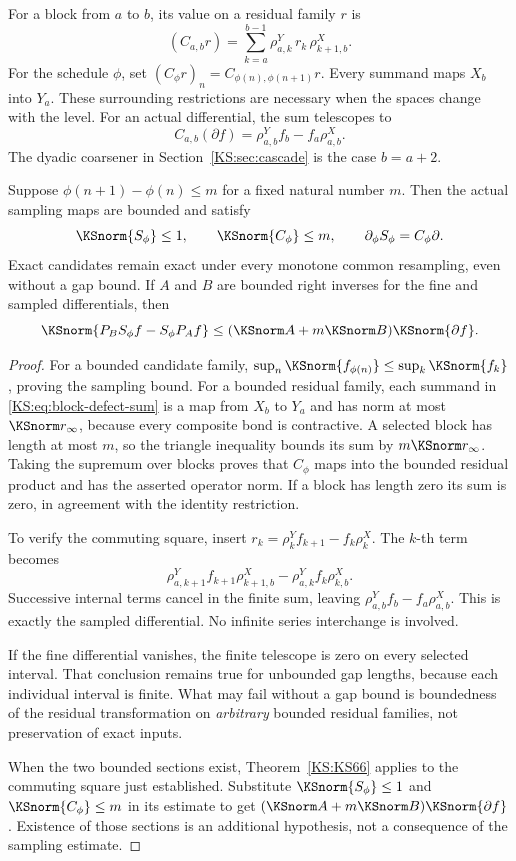 For a block from \(a\) to \(b\), its value on a residual family \(r\) is
\begin{equation}\label{KS:eq:block-defect-sum}
 (C_{a,b}r)=\sum_{k=a}^{b-1}
 \rho^Y_{a,k}\,r_k\,\rho^X_{k+1,b}.
\end{equation}
For the schedule \(\phi\), set \((C_\phi r)_n=C_{\phi(n),\phi(n+1)}r\). Every summand maps \(X_b\) into \(Y_a\). These surrounding restrictions are necessary when the spaces change with the level. For an actual differential, the sum telescopes to
\[
 C_{a,b}(\partial f)=\rho^Y_{a,b}f_b-f_a\rho^X_{a,b}.
\]
The dyadic coarsener in Section~\ref{KS:sec:cascade} is the case \(b=a+2\).

\begin{KStheorem}\label{KS:KS67}
Suppose \(\phi(n+1)-\phi(n)\le m\) for a fixed natural number \(m\). Then the actual sampling maps are bounded and satisfy
\[
 \KSnorm{S_\phi}\le1,\qquad \KSnorm{C_\phi}\le m,
 \qquad \partial_\phi S_\phi=C_\phi\partial.
\]
Exact candidates remain exact under every monotone common resampling, even without a gap bound. If \(A\) and \(B\) are bounded right inverses for the fine and sampled differentials, then
\[
 \KSnorm{P_BS_\phi f-S_\phi P_Af}
 \le(\KSnorm A+m\KSnorm B)\KSnorm{\partial f}.
\]
\end{KStheorem}
\begin{proof}
For a bounded candidate family, \(\sup_n\KSnorm{f_{\phi(n)}}\le\sup_k\KSnorm{f_k}\), proving the sampling bound. For a bounded residual family, each summand in \eqref{KS:eq:block-defect-sum} is a map from \(X_b\) to \(Y_a\) and has norm at most \(\KSnorm r_\infty\), because every composite bond is contractive. A selected block has length at most \(m\), so the triangle inequality bounds its sum by \(m\KSnorm r_\infty\). Taking the supremum over blocks proves that \(C_\phi\) maps into the bounded residual product and has the asserted operator norm. If a block has length zero its sum is zero, in agreement with the identity restriction.

To verify the commuting square, insert
\(r_k=\rho^Y_kf_{k+1}-f_k\rho^X_k\). The \(k\)-th term becomes
\[
 \rho^Y_{a,k+1}f_{k+1}\rho^X_{k+1,b}
 -\rho^Y_{a,k}f_k\rho^X_{k,b}.
\]
Successive internal terms cancel in the finite sum, leaving \(\rho^Y_{a,b}f_b-f_a\rho^X_{a,b}\). This is exactly the sampled differential. No infinite series interchange is involved.

If the fine differential vanishes, the finite telescope is zero on every selected interval. That conclusion remains true for unbounded gap lengths, because each individual interval is finite. What may fail without a gap bound is boundedness of the residual transformation on \emph{arbitrary} bounded residual families, not preservation of exact inputs.

When the two bounded sections exist, Theorem~\ref{KS:KS66} applies to the commuting square just established. Substitute \(\KSnorm{S_\phi}\le1\) and \(\KSnorm{C_\phi}\le m\) in its estimate to get \((\KSnorm A+m\KSnorm B)\KSnorm{\partial f}\). Existence of those sections is an additional hypothesis, not a consequence of the sampling estimate.
\end{proof}
